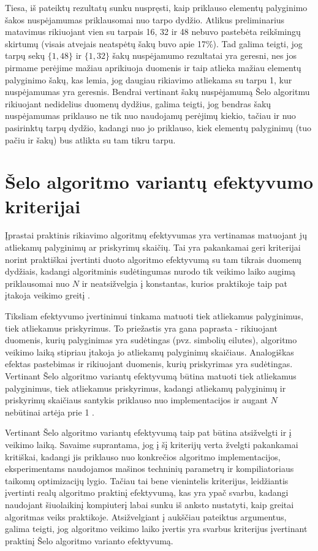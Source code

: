 \documentclass{VUMIFInfBakalaurinis}
\begin{document}
Tiesa, iš pateiktų rezultatų sunku nuspręsti, kaip priklauso elementų palyginimo šakos nuspėjamumas priklausomai nuo tarpo dydžio.
Atlikus preliminarius matavimus rikiuojant vien su tarpais 16, 32 ir 48 nebuvo pastebėta reikšmingų skirtumų (visais atvejais neatspėtų šakų buvo apie 17\%).
Tad galima teigti, jog tarpų sekų $\{1, 48 \}$ ir $\{1, 32 \}$ šakų nuspėjamumo rezultatai yra geresni, nes jos pirmame perėjime
mažiau aprikiuoja duomenis ir taip atlieka mažiau elementų palyginimo šakų, kas lemia, jog daugiau rikiavimo atliekama su tarpu 1, kur nuspėjamumas yra geresnis.
Bendrai vertinant šakų nuspėjamumą Šelo algoritmu rikiuojant nedidelius duomenų dydžius,
galima teigti, jog bendras šakų nuspėjamumas priklauso ne tik nuo naudojamų perėjimų kiekio, tačiau ir nuo
pasirinktų tarpų dydžio, kadangi nuo jo priklauso, kiek elementų palyginimų (tuo pačiu ir šakų) bus atlikta su tam tikru tarpu.

\section{Šelo algoritmo variantų efektyvumo kriterijai}

Įprastai praktinis rikiavimo algoritmų efektyvumas yra vertinamas matuojant jų atliekamų palyginimų ar priskyrimų skaičių.
Tai yra pakankamai geri kriterijai norint praktiškai įvertinti duoto algoritmo efektyvumą su tam tikrais duomenų dydžiais,
kadangi algoritminis sudėtingumas nurodo tik veikimo laiko augimą priklausomai nuo $N$ ir
neatsižvelgia į konstantas, kurios praktikoje taip pat įtakoja veikimo greitį \cite{biggar2005sorting}.

Tiksliam efektyvumo įvertinimui tinkama matuoti tiek atliekamus palyginimus, tiek atliekamus priskyrimus.
To priežastis yra gana paprasta - rikiuojant duomenis, kurių palyginimas yra sudėtingas (pvz. simbolių eilutes),
algoritmo veikimo laiką stipriau įtakoja jo atliekamų palyginimų skaičiaus.
Analogiškas efektas pastebimas ir rikiuojant duomenis, kurių priskyrimas yra sudėtingas.
Vertinant Šelo algoritmo variantų efektyvumą būtina matuoti tiek atliekamus palyginimus, tiek atliekamus priskyrimus, kadangi
atliekamų palyginimų ir priskyrimų skaičiaus santykis priklauso nuo implementacijos ir augant $N$ nebūtinai artėja prie 1 \cite{Radavičius_Baranauskas_2013}.

Vertinant Šelo algoritmo variantų efektyvumą taip pat būtina atsižvelgti ir į veikimo laiką.
Savaime suprantama, jog į šį kriterijų verta žvelgti pakankamai kritiškai, kadangi jis priklauso nuo konkrečios algoritmo implementacijos,
eksperimentams naudojamos mašinos techninių parametrų ir kompiliatoriaus taikomų optimizacijų lygio.
Tačiau tai bene vienintelis kriterijus, leidžiantis įvertinti realų algoritmo praktinį efektyvumą, kas yra ypač svarbu,
kadangi naudojant šiuolaikinį kompiuterį labai sunku iš anksto nustatyti, kaip greitai algoritmas veiks praktikoje.
Atsižvelgiant į aukščiau pateiktus argumentus, galima teigti, jog
algoritmo veikimo laiko įvertis yra svarbus kriterijus įvertinant praktinį Šelo algoritmo varianto efektyvumą.
\end{document}
